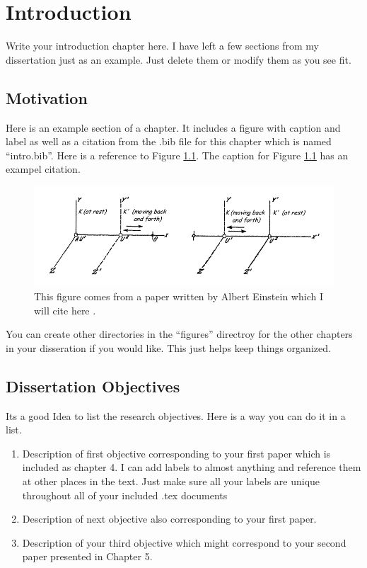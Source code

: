 \chapter{Introduction \label{chp1}}

Write your introduction chapter here. I have left a few sections from my
dissertation just as an example. Just delete them or modify them as you
see fit.

\section{Motivation}

Here is an example section of a chapter. It includes a figure with caption and
label as well as a citation from the .bib file for this chapter which is named
``intro.bib''. Here is a reference to Figure \ref{exampleFig}.  The caption for
Figure \ref{exampleFig} has an exampel citation.

\begin{figure}[!ht]
    \centerline{\includegraphics[width=5.0in]{figures/chp1/exampleFig.png}}
    \caption{This figure comes from a paper written by Albert Einstein which I
    will cite here \cite{einstein1916foundation}.  \label{exampleFig}}
\end{figure}

You can create other directories in the ``figures'' directroy for the other
chapters in your disseration if you would like. This just helps keep things
organized.


\section{Dissertation Objectives}

Its a good Idea to list the research objectives. Here is a way you can do it
in a list.
\begin{enumerate}
        \item Description of first objective corresponding to your first paper
            which is included as chapter 4. I can add labels to almost anything
            and reference them at other places in the text. Just make sure all
            your labels are unique throughout all of your included .tex
            documents \label{obj1}
        \item Description of next objective also corresponding to your first
            paper. \label{obj2}
        \item Description of your third objective which might correspond to your
            second paper presented in Chapter 5. \label{obj3}
\end{enumerate}


